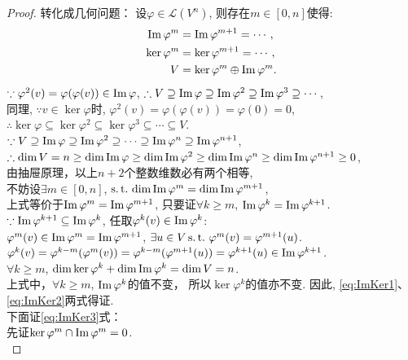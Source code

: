 \begin{proof}
  转化成几何问题：
  设$\varphi \in \mathcal{L}(V^n)$, 则存在$m \in [0,n]$使得: 
  \begin{align}
    \operatorname{Im}\varphi^m &  = \operatorname{Im}\varphi^{m+1}=\cdots, \label{eq:ImKer1}\\
    \ker\varphi^m & = \ker\varphi^{m+1}=\cdots,\label{eq:ImKer2} \\
    V & = \ker\varphi^m\oplus\operatorname{Im}\varphi^m.\label{eq:ImKer3}
  \end{align}
  $\because \varphi^2(v) = \varphi(\varphi(v)) \in \operatorname{Im}\varphi$, 
  $\therefore V \supseteq \operatorname{Im}\varphi \supseteq \operatorname{Im}\varphi^2
  \supseteq \operatorname{Im}\varphi^3 \supseteq \cdots$, \\
  同理, $\because v \in \ker\varphi$时,
  $\varphi^2(v) = \varphi(\varphi(v))=\varphi(0) = 0$, \\
  $\therefore \ker\varphi \subseteq \ker\varphi^2
  \subseteq \ker\varphi^3
  \subseteq \cdots \subseteq V$.\\
  $\because V \supseteq \operatorname{Im}\varphi \supseteq \operatorname{Im}\varphi^2
  \supseteq \cdots \supseteq \operatorname{Im}\varphi^n \supseteq \operatorname{Im}\varphi^{n+1}$, \\
  $\therefore \dim V = n \geq \dim\operatorname{Im}\varphi \geq \dim\operatorname{Im}\varphi^2
  \geq \dim\operatorname{Im}\varphi^n \geq \dim\operatorname{Im}\varphi^{n+1} \geq 0$, \\
  由抽屉原理，以上$n+2$个整数维数必有两个相等, \\
  不妨设$\exists m \in [0, n]$, $\operatorname{{}s.t.{}} \dim\operatorname{Im}\varphi^m = \dim\operatorname{Im}\varphi^{m+1}$, \\
  上式等价于$\operatorname{Im}\varphi^m = \operatorname{Im}\varphi^{m+1}$,
  只要证$\forall k \geq m$, $\operatorname{Im}\varphi^k = \operatorname{Im}\varphi^{k+1}$. \\
  $\because \operatorname{Im}\varphi^{k+1} \subseteq \operatorname{Im}\varphi^k$,
  任取$\varphi^k(v) \in \operatorname{Im}\varphi^k$: \\
  $\varphi^m(v) \in \operatorname{Im}\varphi^m = \operatorname{Im}\varphi^{m+1}$,
  $\exists u \in V \operatorname{{}s.t.{}} \varphi^m(v) = \varphi^{m+1}(u)$. \\
  $\varphi^k(v)= \varphi^{k-m}(\varphi^m(v)) =
  \varphi^{k-m}(\varphi^{m+1}(u)) = \varphi^{k+1}(u) \in \operatorname{Im}\varphi^{k+1}$. \\
  $\forall k \geq m$, $\dim\ker\varphi^k + \dim\operatorname{Im}\varphi^k = \dim V = n$. \\
  上式中，$\forall k \geq m$, $\operatorname{Im}\varphi^k$的值不变，
  所以$\ker\varphi^k$的值亦不变.
  因此, \ref{eq:ImKer1}、\ref{eq:ImKer2}两式得证. \\
  下面证\ref{eq:ImKer3}式： \\
  先证$\ker\varphi^m \cap \operatorname{Im}\varphi^m=0$.\\

\end{proof}
